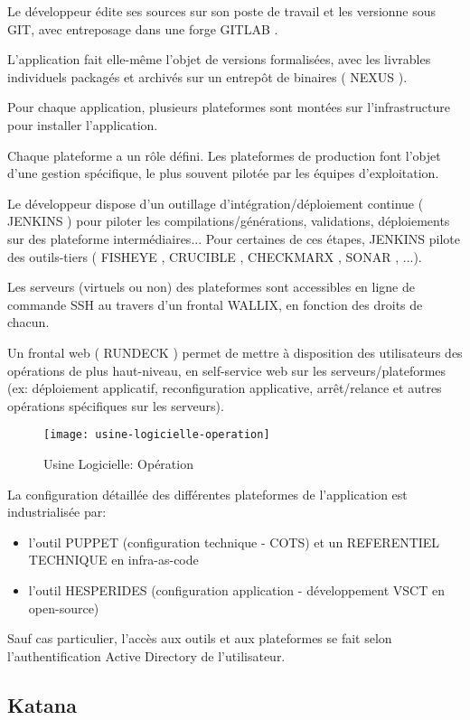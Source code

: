 Le développeur édite ses sources sur son poste de travail et les versionne sous GIT, avec entreposage dans une forge GITLAB .

L'application fait elle-même l'objet de versions formalisées, avec les livrables individuels packagés et archivés sur un entrepôt de binaires ( NEXUS ).

Pour chaque application, plusieurs plateformes sont montées sur l'infrastructure pour installer l'application.

Chaque plateforme a un rôle défini. Les plateformes de production font l'objet d'une gestion spécifique, le plus souvent pilotée par les équipes d'exploitation.

Le développeur dispose d'un outillage d'intégration/déploiement continue ( JENKINS ) pour piloter les compilations/générations, validations, déploiements sur des plateforme intermédiaires...
Pour certaines de ces étapes, JENKINS pilote des outils-tiers ( FISHEYE , CRUCIBLE , CHECKMARX , SONAR , ...).

Les serveurs (virtuels ou non) des plateformes sont accessibles en ligne de commande SSH au travers d'un frontal WALLIX, en fonction des droits de chacun.

Un frontal web ( RUNDECK ) permet de mettre à disposition des utilisateurs des opérations de plus haut-niveau, en self-service web sur les serveurs/plateformes (ex: déploiement applicatif, reconfiguration applicative, arrêt/relance et autres opérations spécifiques sur les serveurs).

\begin{figure}[ht]
\centering
\texttt{[image: usine-logicielle-operation]}
\caption{Usine Logicielle: Opération}
\end{figure}

La configuration détaillée des différentes plateformes de l'application est industrialisée par:
\begin{itemize}
  \item l'outil PUPPET (configuration technique - COTS) et un REFERENTIEL TECHNIQUE en infra-as-code
  \item l'outil HESPERIDES (configuration application - développement VSCT en open-source)
\end{itemize}

Sauf cas particulier, l'accès aux outils et aux plateformes se fait selon l'authentification Active Directory de l'utilisateur.
\subsection{Katana}

